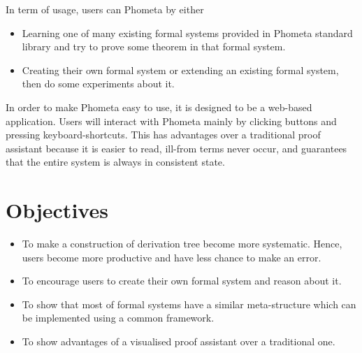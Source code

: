 \documentclass[master.tex]{subfiles}
\begin{document}
In term of usage, users can Phometa by either
\begin{itemize}
\item Learning one of many existing formal systems provided in Phometa
  standard library and try to prove some theorem in that formal system.
\item Creating their own formal system or extending an existing formal system,
  then do some experiments about it.
\end{itemize}

In order to make Phometa easy to use, it is designed to be a web-based
application. Users will interact with Phometa mainly by clicking buttons and
pressing keyboard-shortcuts. This has advantages over a traditional proof
assistant because it is easier to read, ill-from terms never occur, and
guarantees that the entire system is always in consistent state.

\section{Objectives}
\begin{itemize}
\item To make a construction of derivation tree become more systematic. Hence,
  users become more productive and have less chance to make an error.
  \item To encourage users to create their own formal system and reason about
    it.
  \item To show that most of formal systems have a similar meta-structure which
    can be implemented using a common framework.
  \item To show advantages of a visualised proof assistant over a traditional
    one.
\end{itemize}
\end{document}
